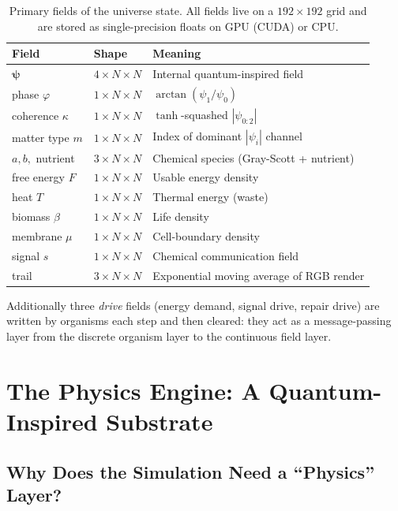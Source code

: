 \documentclass[12pt,a4paper]{article}
\newcommand{\bpsi}{\boldsymbol{\psi}}
\begin{document}
\begin{table}[h]
\centering
\renewcommand{\arraystretch}{1.3}
\begin{tabular}{lll}
\toprule
\textbf{Field} & \textbf{Shape} & \textbf{Meaning} \\
\midrule
$\bpsi$ & $4 \times N \times N$ & Internal quantum-inspired field \\
phase $\varphi$ & $1 \times N \times N$ & $\arctan(\psi_1/\psi_0)$ \\
coherence $\kappa$ & $1 \times N \times N$ & $\tanh$-squashed $|\psi_{0:2}|$ \\
matter type $m$ & $1 \times N \times N$ & Index of dominant $|\psi_i|$ channel \\
\midrule
$a, b,$ nutrient & $3 \times N \times N$ & Chemical species (Gray-Scott + nutrient) \\
\midrule
free energy $F$ & $1 \times N \times N$ & Usable energy density \\
heat $T$ & $1 \times N \times N$ & Thermal energy (waste) \\
\midrule
biomass $\beta$ & $1 \times N \times N$ & Life density \\
membrane $\mu$ & $1 \times N \times N$ & Cell-boundary density \\
signal $s$ & $1 \times N \times N$ & Chemical communication field \\
trail & $3 \times N \times N$ & Exponential moving average of RGB render \\
\bottomrule
\end{tabular}
\caption{Primary fields of the universe state.
  All fields live on a $192\times192$ grid and are stored
  as single-precision floats on GPU (CUDA) or CPU.}
\end{table}

Additionally three \emph{drive} fields
(energy demand, signal drive, repair drive) are written by organisms
each step and then cleared:
they act as a message-passing layer from the discrete organism layer
to the continuous field layer.

\section{The Physics Engine: A Quantum-Inspired Substrate}

\subsection{Why Does the Simulation Need a ``Physics'' Layer?}
\end{document}
